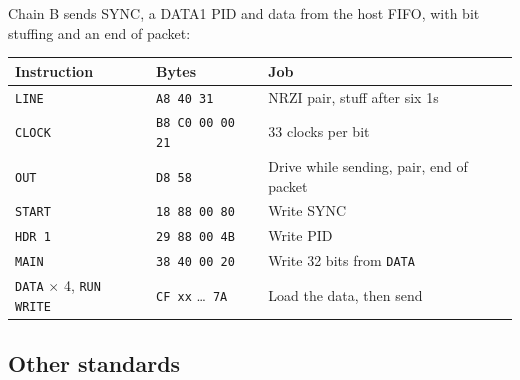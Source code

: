\documentclass[11pt,a4paper]{article}
\newcommand{\sig}[1]{\texttt{#1}}
\begin{document}
Chain B sends SYNC, a DATA1 PID and data from the host FIFO, with bit stuffing and an end of packet:

\begin{center}
\begin{tabular}{@{}lll@{}}
\toprule
Instruction & Bytes & Job \\
\midrule
\sig{LINE} & \texttt{A8 40 31} & NRZI pair, stuff after six 1s \\
\sig{CLOCK} & \texttt{B8 C0 00 00 21} & 33 clocks per bit \\
\sig{OUT} & \texttt{D8 58} & Drive while sending, pair, end of packet \\
\sig{START} & \texttt{18 88 00 80} & Write SYNC \\
\sig{HDR 1} & \texttt{29 88 00 4B} & Write PID \\
\sig{MAIN} & \texttt{38 40 00 20} & Write 32 bits from \sig{DATA} \\
\sig{DATA} $\times$ 4, \sig{RUN WRITE} & \texttt{CF xx} \ldots\ \texttt{7A} & Load the data, then send \\
\bottomrule
\end{tabular}
\end{center}

\subsection{Other standards}
\end{document}
